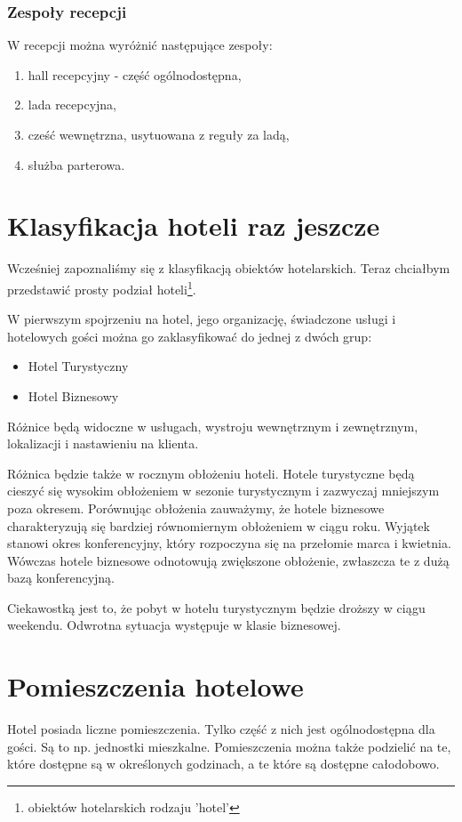 \documentclass[a4paper,onecolumn,oneside,11pt,wide,floatssmall]{mwrep}
\theoremstyle{definition}
\theoremstyle{plain}%
\theoremstyle{remark}
\begin{document}
\subsubsection{Zespoły recepcji}
W recepcji można wyróżnić następujące zespoły\cite[8-10]{hotel2:part1}:
\begin{enumerate}
  \item hall recepcyjny - część ogólnodostępna,
  \item lada recepcyjna,
  \item cześć wewnętrzna, usytuowana z reguły za ladą,
  \item służba parterowa.
\end{enumerate}

\section{Klasyfikacja hoteli raz jeszcze}
Wcześniej zapoznaliśmy się z klasyfikacją obiektów hotelarskich. Teraz 
chciałbym przedstawić prosty podział hoteli\footnote{obiektów hotelarskich rodzaju 'hotel'}.

W pierwszym spojrzeniu na hotel, jego organizację, świadczone usługi i 
hotelowych gości można go zaklasyfikować do jednej z dwóch grup:

\begin{itemize}
  \item Hotel Turystyczny
  \item Hotel Biznesowy
\end{itemize}

Różnice będą widoczne w usługach, wystroju wewnętrznym i zewnętrznym, 
lokalizacji i nastawieniu na klienta.

Różnica będzie także w rocznym obłożeniu hoteli. Hotele turystyczne będą 
cieszyć się wysokim obłożeniem w sezonie turystycznym i zazwyczaj 
mniejszym poza okresem. Porównując obłożenia zauważymy, że hotele biznesowe 
charakteryzują się bardziej równomiernym obłożeniem w ciągu roku. 
Wyjątek stanowi okres konferencyjny, który rozpoczyna się na przełomie 
marca i kwietnia. Wówczas hotele biznesowe odnotowują zwiększone obłożenie, zwłaszcza te z dużą bazą konferencyjną.

Ciekawostką jest to, że pobyt w hotelu turystycznym będzie droższy w ciągu 
weekendu. Odwrotna sytuacja występuje w klasie biznesowej.

\section{Pomieszczenia hotelowe}
Hotel posiada liczne pomieszczenia. Tylko część z nich jest ogólnodostępna dla gości. Są to np. jednostki mieszkalne. Pomieszczenia można także podzielić na te, które dostępne są w określonych godzinach, a te które są dostępne całodobowo.
\end{document}
